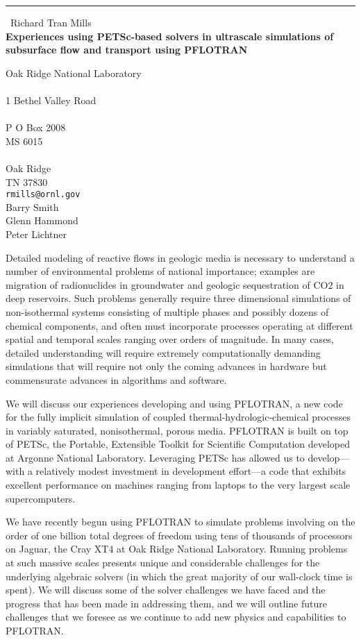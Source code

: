 \documentclass{report}
\begin{document}
\begin{center}
\rule{6in}{1pt} \
{\large Richard Tran Mills \\
{\bf Experiences using PETSc-based solvers in ultrascale simulations of subsurface flow and transport using PFLOTRAN}}

Oak Ridge National Laboratory \\ \\ 1 Bethel Valley Road \\ \\ P O Box 2008 \\ MS 6015 \\ \\ Oak Ridge \\ TN 37830
\\
{\tt rmills@ornl.gov}\\
Barry Smith\\
Glenn Hammond\\
	Peter Lichtner\end{center}

Detailed modeling of reactive flows in geologic media is necessary to
understand a number of environmental problems of national importance;
examples are migration of radionuclides in groundwater and geologic
sequestration of CO2 in deep reservoirs. Such problems generally require
three dimensional simulations of non-isothermal systems consisting of
multiple phases and possibly dozens of chemical components, and often
must incorporate processes operating at different spatial and temporal
scales ranging over orders of magnitude. In many cases, detailed
understanding
will require extremely computationally demanding simulations that will
require not only the coming advances in hardware but commensurate
advances in algorithms and software.

We will discuss our experiences developing and using PFLOTRAN, a new code
for the fully implicit simulation of coupled thermal-hydrologic-chemical
processes in variably saturated, nonisothermal, porous media. PFLOTRAN is
built on top of PETSc, the Portable, Extensible Toolkit for Scientific
Computation developed at Argonne National Laboratory. Leveraging PETSc
has allowed us to develop---with a relatively modest investment in
development effort---a code that exhibits excellent performance on
machines ranging from laptops to the very largest scale supercomputers.

We have recently begun using PFLOTRAN to simulate problems involving on
the order of one billion total degrees of freedom using tens of thousands
of processors on Jaguar, the Cray XT4 at Oak Ridge National Laboratory.
Running problems at such massive scales presents unique and considerable
challenges for the underlying algebraic solvers (in which the great
majority of our wall-clock time is spent). We will discuss some of the
solver challenges we have faced and the progress that has been made in
addressing them, and we will outline future challenges
that we foresee as we continue to add new physics and capabilities to PFLOTRAN.
\end{document}
